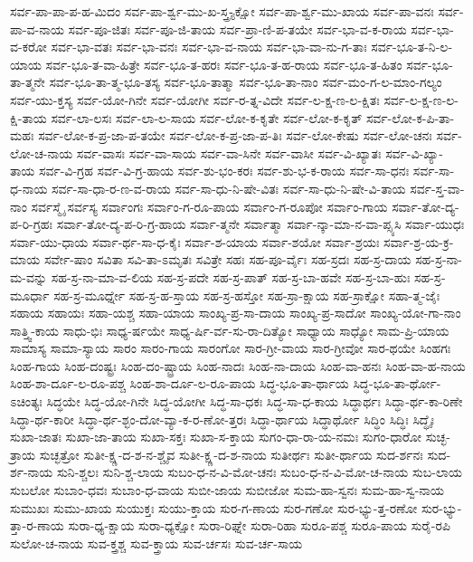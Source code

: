 {ಸರ್ವ-ಪಾ-ಪಾ-ಪ-ಹ-ಮಿದಂ
ಸರ್ವ-ಪಾ-ರ್ಶ್ವ-ಮು-ಖ-ಸ್ತ್ರ-್ಯಕ್ಷೋ
ಸರ್ವ-ಪಾ-ರ್ಶ್ವ-ಮು-ಖಾಯ
ಸರ್ವ-ಪಾ-ವನಃ
ಸರ್ವ-ಪಾ-ವ-ನಾಯ
ಸರ್ವ-ಪೂ-ಜಿತಃ
ಸರ್ವ-ಪೂ-ಜಿ-ತಾಯ
ಸರ್ವ-ಪ್ರಾ-ಣಿ-ಪ-ತಯೇ
ಸರ್ವ-ಭಾ-ವ-ಕ-ರಾಯ
ಸರ್ವ-ಭಾ-ವ-ಕರೋ
ಸರ್ವ-ಭಾ-ವತಃ
ಸರ್ವ-ಭಾ-ವನಃ
ಸರ್ವ-ಭಾ-ವ-ನಾಯ
ಸರ್ವ-ಭಾ-ವಾ-ನು-ಗ-ತಾಃ
ಸರ್ವ-ಭೂ-ತ-ನಿ-ಲ-ಯಾಯ
ಸರ್ವ-ಭೂ-ತ-ವಾ-ಹಿತ್ರೇ
ಸರ್ವ-ಭೂ-ತ-ಹರಃ
ಸರ್ವ-ಭೂ-ತ-ಹ-ರಾಯ
ಸರ್ವ-ಭೂ-ತ-ಹಿತಂ
ಸರ್ವ-ಭೂ-ತಾ-ತ್ಮನೇ
ಸರ್ವ-ಭೂ-ತಾ-ತ್ಮ-ಭೂ-ತಸ್ಯ
ಸರ್ವ-ಭೂ-ತಾತ್ಮಾ
ಸರ್ವ-ಭೂ-ತಾ-ನಾಂ
ಸರ್ವ-ಮಂ-ಗ-ಲ-ಮಾಂ-ಗಲ್ಯಂ
ಸರ್ವ-ಯು-ಕ್ತಸ್ಯ
ಸರ್ವ-ಯೋ-ಗಿನೇ
ಸರ್ವ-ಯೋಗೀ
ಸರ್ವ-ರ-ತ್ನ-ವಿದೇ
ಸರ್ವ-ಲ-ಕ್ಷ-ಣ-ಲ-ಕ್ಷಿತಃ
ಸರ್ವ-ಲ-ಕ್ಷ-ಣ-ಲ-ಕ್ಷಿ-ತಾಯ
ಸರ್ವ-ಲಾ-ಲಸಃ
ಸರ್ವ-ಲಾ-ಲ-ಸಾಯ
ಸರ್ವ-ಲೋ-ಕ-ಕೃತೇ
ಸರ್ವ-ಲೋ-ಕ-ಕೃತ್
ಸರ್ವ-ಲೋ-ಕ-ಪಿ-ತಾ-ಮಹಃ
ಸರ್ವ-ಲೋ-ಕ-ಪ್ರ-ಜಾ-ಪ-ತಯೇ
ಸರ್ವ-ಲೋ-ಕ-ಪ್ರ-ಜಾ-ಪ-ತಿಃ
ಸರ್ವ-ಲೋ-ಕೇಷು
ಸರ್ವ-ಲೋ-ಚನಃ
ಸರ್ವ-ಲೋ-ಚ-ನಾಯ
ಸರ್ವ-ವಾಸಃ
ಸರ್ವ-ವಾ-ಸಾಯ
ಸರ್ವ-ವಾ-ಸಿನೇ
ಸರ್ವ-ವಾಸೀ
ಸರ್ವ-ವಿ-ಖ್ಯಾತಃ
ಸರ್ವ-ವಿ-ಖ್ಯಾ-ತಾಯ
ಸರ್ವ-ವಿ-ಗ್ರಹ
ಸರ್ವ-ವಿ-ಗ್ರ-ಹಾಯ
ಸರ್ವ-ಶು-ಭಂ-ಕರಃ
ಸರ್ವ-ಶು-ಭ-ಕ-ರಾಯ
ಸರ್ವ-ಸಾ-ಧನಃ
ಸರ್ವ-ಸಾ-ಧ-ನಾಯ
ಸರ್ವ-ಸಾ-ಧಾ-ರ-ಣ-ವ-ರಾಯ
ಸರ್ವ-ಸಾ-ಧು-ನಿ-ಷೇ-ವಿತಃ
ಸರ್ವ-ಸಾ-ಧು-ನಿ-ಷೇ-ವಿ-ತಾಯ
ಸರ್ವ-ಸ್ತ-ವಾ-ನಾಂ
ಸರ್ವಸ್ಮೈ
ಸರ್ವಸ್ಯ
ಸರ್ವಾಂಗಃ
ಸರ್ವಾಂ-ಗ-ರೂ-ಪಾಯ
ಸರ್ವಾಂ-ಗ-ರೂಪೋ
ಸರ್ವಾಂ-ಗಾಯ
ಸರ್ವಾ-ತೋ-ದ್ಯ-ಪ-ರಿ-ಗ್ರಹಃ
ಸರ್ವಾ-ತೋ-ದ್ಯ-ಪ-ರಿ-ಗ್ರ-ಹಾಯ
ಸರ್ವಾ-ತ್ಮನೇ
ಸರ್ವಾತ್ಮಾ
ಸರ್ವಾ-ನ್ಕಾ-ಮಾ-ನ-ವಾ-ಪ್ಸ್ಯಸಿ
ಸರ್ವಾ-ಯುಧಃ
ಸರ್ವಾ-ಯು-ಧಾಯ
ಸರ್ವಾ-ರ್ಥ-ಸಾ-ಧ-ಕೈಃ
ಸರ್ವಾ-ಶ-ಯಾಯ
ಸರ್ವಾ-ಶಯೋ
ಸರ್ವಾ-ಶ್ರಯಃ
ಸರ್ವಾ-ಶ್ರ-ಯ-ಕ್ರ-ಮಾಯ
ಸರ್ವೇ-ಷಾಂ
ಸವಿತಾ
ಸವಿ-ತಾ-ಽಮೃತಃ
ಸವಿತ್ರೇ
ಸಹಃ
ಸಹ-ಪೂ-ರ್ವೈಃ
ಸಹ-ಸ್ರದಃ
ಸಹ-ಸ್ರ-ದಾಯ
ಸಹ-ಸ್ರ-ನಾ-ಮ-ವನ್ನು
ಸಹ-ಸ್ರ-ನಾ-ಮಾ-ವ-ಲಿಯ
ಸಹ-ಸ್ರ-ಪದೇ
ಸಹ-ಸ್ರ-ಪಾತ್
ಸಹ-ಸ್ರ-ಬಾ-ಹವೇ
ಸಹ-ಸ್ರ-ಬಾ-ಹುಃ
ಸಹ-ಸ್ರ-ಮೂರ್ಧಾ
ಸಹ-ಸ್ರ-ಮೂರ್ಧ್ನೇ
ಸಹ-ಸ್ರ-ಹ-ಸ್ತಾಯ
ಸಹ-ಸ್ರ-ಹಸ್ತೋ
ಸಹ-ಸ್ರಾ-ಕ್ಷಾಯ
ಸಹ-ಸ್ರಾಕ್ಷೋ
ಸಹಾ-ತ್ಮ-ಜೈಃ
ಸಹಾಯ
ಸಹಾಯಃ
ಸಹಾ-ಯಶ್ಚ
ಸಹಾ-ಯಾಯ
ಸಾಂಖ್ಯ-ಪ್ರ-ಸಾ-ದಾಯ
ಸಾಂಖ್ಯ-ಪ್ರ-ಸಾದೋ
ಸಾಂಖ್ಯ-ಯೋ-ಗಾ-ನಾಂ
ಸಾತ್ತ್ವಿ-ಕಾಯ
ಸಾಧು-ಭಿಃ
ಸಾಧ್ಯ-ರ್ಷಯೇ
ಸಾಧ್ಯ-ರ್ಷಿ-ರ್ವ-ಸು-ರಾ-ದಿತ್ಯೋ
ಸಾಧ್ಯಾಯ
ಸಾಧ್ಯೋ
ಸಾಮ-ಪ್ರಿ-ಯಾಯ
ಸಾಮಾಸ್ಯ
ಸಾಮಾ-ಸ್ಯಾಯ
ಸಾರಂ
ಸಾರಂ-ಗಾಯ
ಸಾರಂಗೋ
ಸಾರ-ಗ್ರೀ-ವಾಯ
ಸಾರ-ಗ್ರೀವೋ
ಸಾರ-ಥಯೇ
ಸಿಂಹಗಃ
ಸಿಂಹ-ಗಾಯ
ಸಿಂಹ-ದಂಷ್ಟ್ರಃ
ಸಿಂಹ-ದಂ-ಷ್ಟ್ರಾಯ
ಸಿಂಹ-ನಾದಃ
ಸಿಂಹ-ನಾ-ದಾಯ
ಸಿಂಹ-ವಾ-ಹನಃ
ಸಿಂಹ-ವಾ-ಹ-ನಾಯ
ಸಿಂಹ-ಶಾ-ರ್ದೂ-ಲ-ರೂ-ಪಶ್ಚ
ಸಿಂಹ-ಶಾ-ರ್ದೂ-ಲ-ರೂ-ಪಾಯ
ಸಿದ್ಧ-ಭೂ-ತಾ-ರ್ಥಾಯ
ಸಿದ್ಧ-ಭೂ-ತಾ-ರ್ಥೋ-ಽಚಿಂತ್ಯಃ
ಸಿದ್ಧಯೇ
ಸಿದ್ಧ-ಯೋ-ಗಿನೇ
ಸಿದ್ಧ-ಯೋಗೀ
ಸಿದ್ಧ-ಸಾ-ಧಕಃ
ಸಿದ್ಧ-ಸಾ-ಧ-ಕಾಯ
ಸಿದ್ಧಾರ್ಥಃ
ಸಿದ್ಧಾ-ರ್ಥ-ಕಾ-ರಿಣೇ
ಸಿದ್ಧಾ-ರ್ಥ-ಕಾರೀ
ಸಿದ್ಧಾ-ರ್ಥ-ಶ್ಛಂ-ದೋ-ವ್ಯಾ-ಕ-ರ-ಣೋ-ತ್ತರಃ
ಸಿದ್ಧಾ-ರ್ಥಾಯ
ಸಿದ್ಧಾರ್ಥೋ
ಸಿದ್ಧಿಂ
ಸಿದ್ಧಿಃ
ಸಿದ್ಧೈಃ
ಸುಖಾ-ಜಾತಃ
ಸುಖಾ-ಜಾ-ತಾಯ
ಸುಖಾ-ಸಕ್ತಃ
ಸುಖಾ-ಸ-ಕ್ತಾಯ
ಸುಗಂ-ಧಾ-ರಾ-ಯ-ನಮಃ
ಸುಗಂ-ಧಾರೋ
ಸುಚ್ಛ-ತ್ರಾಯ
ಸುಚ್ಛತ್ರೋ
ಸುತೀ-ಕ್ಷ್ಣ-ದ-ಶ-ನ-ಶ್ಚೈವ
ಸುತೀ-ಕ್ಷ್ಣ-ದ-ಶ-ನಾಯ
ಸುತೀರ್ಥಃ
ಸುತೀ-ರ್ಥಾಯ
ಸುದ-ರ್ಶನಃ
ಸುದ-ರ್ಶ-ನಾಯ
ಸುನಿ-ಶ್ಚಲಃ
ಸುನಿ-ಶ್ಚ-ಲಾಯ
ಸುಬಂ-ಧ-ನ-ವಿ-ಮೋ-ಚನಃ
ಸುಬಂ-ಧ-ನ-ವಿ-ಮೋ-ಚ-ನಾಯ
ಸುಬ-ಲಾಯ
ಸುಬಲೋ
ಸುಬಾಂ-ಧವಃ
ಸುಬಾಂ-ಧ-ವಾಯ
ಸುಬೀ-ಜಾಯ
ಸುಬೀಜೋ
ಸುಮ-ಹಾ-ಸ್ವನಃ
ಸುಮ-ಹಾ-ಸ್ವ-ನಾಯ
ಸುಮುಖಃ
ಸುಮು-ಖಾಯ
ಸುಯುಕ್ತಃ
ಸುಯು-ಕ್ತಾಯ
ಸುರ-ಗ-ಣಾಯ
ಸುರ-ಗಣೋ
ಸುರ-ಭ್ಯು-ತ್ತ-ರಣೋ
ಸುರ-ಭ್ಯು-ತ್ತಾ-ರ-ಣಾಯ
ಸುರಾ-ಧ್ಯ-ಕ್ಷಾಯ
ಸುರಾ-ಧ್ಯಕ್ಷೋ
ಸುರಾ-ರಿಘ್ನೇ
ಸುರಾ-ರಿಹಾ
ಸುರೂ-ಪಶ್ಚ
ಸುರೂ-ಪಾಯ
ಸುರೈ-ರಪಿ
ಸುಲೋ-ಚ-ನಾಯ
ಸುವ-ಕ್ತ್ರಶ್ಚ
ಸುವ-ಕ್ತ್ರಾಯ
ಸುವ-ರ್ಚಸಃ
ಸುವ-ರ್ಚ-ಸಾಯ
}
